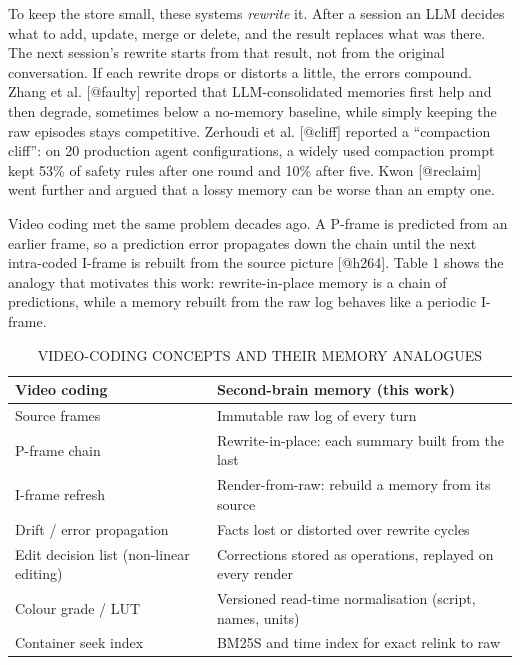 To keep the store small, these systems \textit{rewrite} it. After a session an LLM decides what to add, update, merge or delete, and the result replaces what was there. The next session's rewrite starts from that result, not from the original conversation. If each rewrite drops or distorts a little, the errors compound. Zhang et al. [@faulty] reported that LLM-consolidated memories first help and then degrade, sometimes below a no-memory baseline, while simply keeping the raw episodes stays competitive. Zerhoudi et al. [@cliff] reported a ``compaction cliff'': on 20 production agent configurations, a widely used compaction prompt kept 53\% of safety rules after one round and 10\% after five. Kwon [@reclaim] went further and argued that a lossy memory can be worse than an empty one.

Video coding met the same problem decades ago. A P-frame is predicted from an earlier frame, so a prediction error propagates down the chain until the next intra-coded I-frame is rebuilt from the source picture [@h264]. Table 1 shows the analogy that motivates this work: rewrite-in-place memory is a chain of predictions, while a memory rebuilt from the raw log behaves like a periodic I-frame.

\begin{table}[!htb]
\centering
\caption{VIDEO-CODING CONCEPTS AND THEIR MEMORY ANALOGUES}
\footnotesize\renewcommand{\arraystretch}{1.18}
\begin{tabularx}{\columnwidth}{|p{2.35cm}|X|}
\hline
\textbf{Video coding} & \textbf{Second-brain memory (this work)} \\ \hline
Source frames & Immutable raw log of every turn \\ \hline
P-frame chain & Rewrite-in-place: each summary built from the last \\ \hline
I-frame refresh & Render-from-raw: rebuild a memory from its source \\ \hline
Drift / error propagation & Facts lost or distorted over rewrite cycles \\ \hline
Edit decision list (non-linear editing) & Corrections stored as operations, replayed on every render \\ \hline
Colour grade / LUT & Versioned read-time normalisation (script, names, units) \\ \hline
Container seek index & BM25S and time index for exact relink to raw \\ \hline
\end{tabularx}
\end{table}

